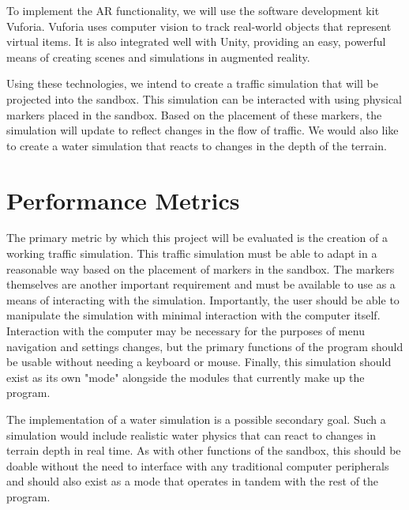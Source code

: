 \documentclass{article}
\begin{document}
To implement the AR functionality, we will use the software development kit Vuforia. Vuforia uses computer vision to track real-world objects that represent virtual items. It is also integrated well with Unity, providing an easy, powerful means of creating scenes and simulations in augmented reality.

Using these technologies, we intend to create a traffic simulation that will be projected into the sandbox. This simulation can be interacted with using physical markers placed in the sandbox. Based on the placement of these markers, the simulation will update to reflect changes in the flow of traffic. We would also like to create a water simulation that reacts to changes in the depth of the terrain.

\section{Performance Metrics}
The primary metric by which this project will be evaluated is the creation of a working traffic simulation. This traffic simulation must be able to adapt in a reasonable way based on the placement of markers in the sandbox. The markers themselves are another important requirement and must be available to use as a means of interacting with the simulation. Importantly, the user should be able to manipulate the simulation with minimal interaction with the computer itself. Interaction with the computer may be necessary for the purposes of menu navigation and settings changes, but the primary functions of the program should be usable without needing a keyboard or mouse. Finally, this simulation should exist as its own "mode" alongside the modules that currently make up the program.

The implementation of a water simulation is a possible secondary goal. Such a simulation would include realistic water physics that can react to changes in terrain depth in real time. As with other functions of the sandbox, this should be doable without the need to interface with any traditional computer peripherals and should also exist as a mode that operates in tandem with the rest of the program.
\end{document}
